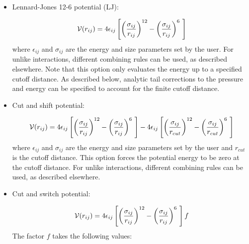 \begin{itemize}

\item Lennard-Jones 12-6 potential (LJ):

\begin{equation}
 {\cal V}(r_{ij})= 4 \epsilon_{ij} \left [  \left ( \frac {\sigma_{ij}} { r_{ij} }\right )^{12} - \left ( \frac {\sigma_{ij}} { r_{ij} }\right )^{6}\ \right ]
\end{equation}
where $\epsilon_{ij}$ and $\sigma_{ij}$ are the energy and size
parameters set by the user. For unlike interactions, different
combining rules can be used, as described elsewhere. Note that this
option only evaluates the energy up to a specified cutoff
distance.  As described below, analytic tail corrections to the pressure and energy can be specified to account for the finite cutoff distance. 



\item Cut and shift potential:

\begin{equation}
{\cal V}(r_{ij})= 4 \epsilon_{ij} \left [  \left ( \frac {\sigma_{ij}} { r_{ij} }\right )^{12} - \left ( \frac {\sigma_{ij}} { r_{ij} }\right )^{6}\ \right ] -  4 \epsilon_{ij} \left [  \left ( \frac {\sigma_{ij}} { r_{cut}}\right )^{12} - \left ( \frac {\sigma_{ij}} { r_{cut} }\right )^{6}\ \right ]
\label{Eq:cut_shift}
\end{equation}
where $\epsilon_{ij}$ and $\sigma_{ij}$ are the energy and size
parameters set by the user and $r_{cut}$ is the cutoff distance. This
option forces the potential energy to be zero at the cutoff
distance. For unlike interactions, different 
combining rules can be used, as described elsewhere.


\item Cut and switch potential:

\begin{equation}
 {\cal V}(r_{ij})= 4 \epsilon_{ij} \left [  \left ( \frac {\sigma_{ij}} { r_{ij} }\right )^{12} - \left ( \frac {\sigma_{ij}} { r_{ij} }\right )^{6}\ \right ] f
 \label{Eq:cut_switch}
\end{equation}
%
The factor $f$ takes the following values:


\end{itemize}

